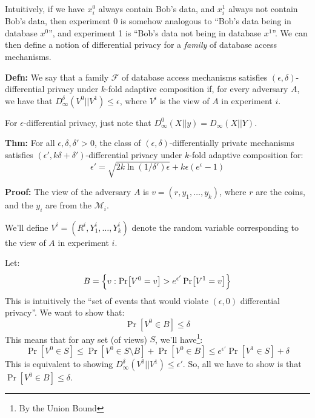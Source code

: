 \documentclass{article}
\theoremstyle{definition}
\begin{document}
Intuitively, if we have $x_i^0$ always contain Bob's data, and $x_i^1$ always not contain Bob's data, then experiment 0 is somehow analogous to ``Bob's data being in database $x^0$'', and experiment 1 is ``Bob's data not being in database $x^1$''.
We can then define a notion of differential privacy for a \emph{family} of database access mechanisms.

\textbf{Defn:}
We say that a family $\mathcal{F}$ of database access mechanisms satisfies $(\epsilon,\delta)$-differential privacy under $k$-fold adaptive composition if, for every adversary $A$, we have that $D^\delta_\infty (V^0||V^1)\leq \epsilon$, where $V^i$ is the view of $A$ in experiment $i$.

For $\epsilon$-differential privacy, just note that $D^0_\infty(X||y) = D_\infty (X||Y)$.

\textbf{Thm: }
For all $\epsilon,\delta,\delta'>0$, the class of $(\epsilon,\delta)$-differentially private mechanisms satisfies $(\epsilon',k\delta+\delta')$-differential privacy under $k$-fold adaptive composition for:
\begin{equation}
\epsilon' = \sqrt{2k\ln(1/\delta')\epsilon} + k\epsilon(e^\epsilon - 1)
\end{equation}

\textbf{Proof: }
The view of the adversary $A$ is $v = (r,y_1,\dots,y_k)$, where $r$ are the coins, and the $y_i$ are from the $\mathcal{M}_i$.

We'll define $V^i  = (R^i,Y_1^i,\dots,Y_k^i)$ denote the random variable corresponding to the view of $A$ in experiment $i$.

Let:
\begin{equation}
B = \Bqty{v : \Pr[V^0 = v] > e^{\epsilon'} \Pr[V^1 = v]}
\end{equation}
This is intuitively the ``set of events that would violate $(\epsilon,0)$ differential privacy''.
We want to show that:
\begin{equation}
\Pr[V^0\in B]\leq \delta
\end{equation}
This means that for any set (of views) $S$, we'll have\footnote{By the Union Bound}:
\begin{equation}
\Pr[V^0\in S] \leq \Pr[V^0\in S\setminus B]+\Pr[V^0\in B]\leq e^{\epsilon'}\Pr[V^1\in S]+ \delta
\end{equation}
This is equivalent to showing $D_\infty^\delta(V^0||V^1)\leq\epsilon'$.
So, all we have to show is that $\Pr[V^0\in B]\leq \delta$.
\end{document}
